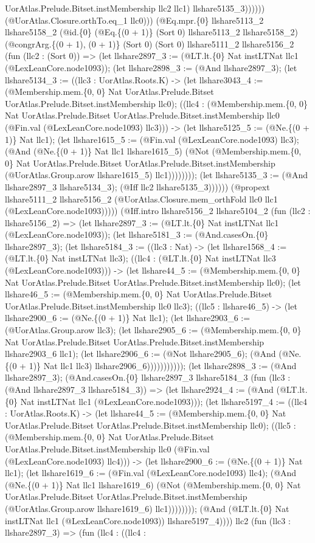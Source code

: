 \documentclass[11pt]{article}
\begin{document}
UorAtlas.Prelude.Bitset.instMembership llc2 llc1) llshare5135\_3)))))) (@UorAtlas.Closure.orthTo.eq\_1 llc0))) (@Eq.mpr.\{0\} llshare5113\_2 llshare5158\_2 (@id.\{0\} (@Eq.\{(0 + 1)\} (Sort 0) llshare5113\_2 llshare5158\_2) (@congrArg.\{(0 + 1), (0 + 1)\} (Sort 0) (Sort 0) llshare5111\_2 llshare5156\_2 (fun (llc2 : (Sort 0)) => (let llshare2897\_3 := (@LT.lt.\{0\} Nat instLTNat llc1 (@LexLeanCore.node1093)); (let llshare2898\_3 := (@And llshare2897\_3); (let llshare5134\_3 := ((llc3 : UorAtlas.Roots.K) -> (let llshare3043\_4 := (@Membership.mem.\{0, 0\} Nat UorAtlas.Prelude.Bitset UorAtlas.Prelude.Bitset.instMembership llc0); ((llc4 : (@Membership.mem.\{0, 0\} Nat UorAtlas.Prelude.Bitset UorAtlas.Prelude.Bitset.instMembership llc0 (@Fin.val (@LexLeanCore.node1093) llc3))) -> (let llshare5125\_5 := (@Ne.\{(0 + 1)\} Nat llc1); (let llshare1615\_5 := (@Fin.val (@LexLeanCore.node1093) llc3); (@And (@Ne.\{(0 + 1)\} Nat llc1 llshare1615\_5) (@Not (@Membership.mem.\{0, 0\} Nat UorAtlas.Prelude.Bitset UorAtlas.Prelude.Bitset.instMembership (@UorAtlas.Group.arow llshare1615\_5) llc1)))))))); (let llshare5135\_3 := (@And llshare2897\_3 llshare5134\_3); (@Iff llc2 llshare5135\_3)))))) (@propext llshare5111\_2 llshare5156\_2 (@UorAtlas.Closure.mem\_orthFold llc0 llc1 (@LexLeanCore.node1093))))) (@Iff.intro llshare5156\_2 llshare5104\_2 (fun (llc2 : llshare5156\_2) => (let llshare2897\_3 := (@LT.lt.\{0\} Nat instLTNat llc1 (@LexLeanCore.node1093)); (let llshare5181\_3 := (@And.casesOn.\{0\} llshare2897\_3); (let llshare5184\_3 := ((llc3 : Nat) -> (let llshare1568\_4 := (@LT.lt.\{0\} Nat instLTNat llc3); ((llc4 : (@LT.lt.\{0\} Nat instLTNat llc3 (@LexLeanCore.node1093))) -> (let llshare44\_5 := (@Membership.mem.\{0, 0\} Nat UorAtlas.Prelude.Bitset UorAtlas.Prelude.Bitset.instMembership llc0); (let llshare46\_5 := (@Membership.mem.\{0, 0\} Nat UorAtlas.Prelude.Bitset UorAtlas.Prelude.Bitset.instMembership llc0 llc3); ((llc5 : llshare46\_5) -> (let llshare2900\_6 := (@Ne.\{(0 + 1)\} Nat llc1); (let llshare2903\_6 := (@UorAtlas.Group.arow llc3); (let llshare2905\_6 := (@Membership.mem.\{0, 0\} Nat UorAtlas.Prelude.Bitset UorAtlas.Prelude.Bitset.instMembership llshare2903\_6 llc1); (let llshare2906\_6 := (@Not llshare2905\_6); (@And (@Ne.\{(0 + 1)\} Nat llc1 llc3) llshare2906\_6))))))))))); (let llshare2898\_3 := (@And llshare2897\_3); (@And.casesOn.\{0\} llshare2897\_3 llshare5184\_3 (fun (llc3 : (@And llshare2897\_3 llshare5184\_3)) => (let llshare2924\_4 := (@And (@LT.lt.\{0\} Nat instLTNat llc1 (@LexLeanCore.node1093))); (let llshare5197\_4 := ((llc4 : UorAtlas.Roots.K) -> (let llshare44\_5 := (@Membership.mem.\{0, 0\} Nat UorAtlas.Prelude.Bitset UorAtlas.Prelude.Bitset.instMembership llc0); ((llc5 : (@Membership.mem.\{0, 0\} Nat UorAtlas.Prelude.Bitset UorAtlas.Prelude.Bitset.instMembership llc0 (@Fin.val (@LexLeanCore.node1093) llc4))) -> (let llshare2900\_6 := (@Ne.\{(0 + 1)\} Nat llc1); (let llshare1619\_6 := (@Fin.val (@LexLeanCore.node1093) llc4); (@And (@Ne.\{(0 + 1)\} Nat llc1 llshare1619\_6) (@Not (@Membership.mem.\{0, 0\} Nat UorAtlas.Prelude.Bitset UorAtlas.Prelude.Bitset.instMembership (@UorAtlas.Group.arow llshare1619\_6) llc1)))))))); (@And (@LT.lt.\{0\} Nat instLTNat llc1 (@LexLeanCore.node1093)) llshare5197\_4)))) llc2 (fun (llc3 : llshare2897\_3) => (fun (llc4 : ((llc4 : 
\end{document}

